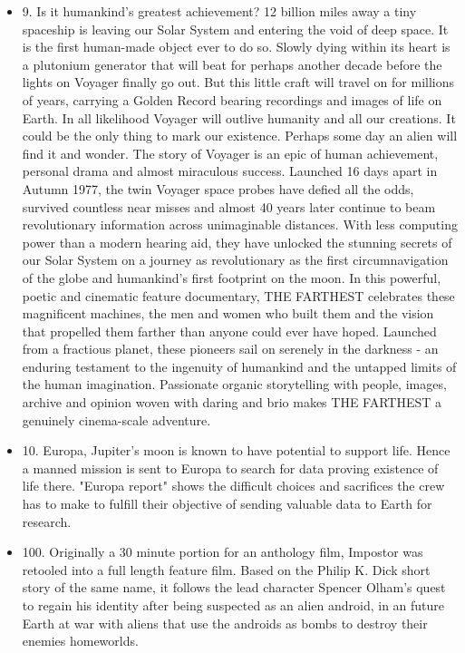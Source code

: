 \begin{itemize}
    \item 9. Is it humankind's greatest achievement? 12 billion miles away a tiny spaceship is leaving our Solar System and entering the void of deep space. It is the first human-made object ever to do so. Slowly dying within its heart is a plutonium generator that will beat for perhaps another decade before the lights on Voyager finally go out. But this little craft will travel on for millions of years, carrying a Golden Record bearing recordings and images of life on Earth. In all likelihood Voyager will outlive humanity and all our creations. It could be the only thing to mark our existence. Perhaps some day an alien will find it and wonder. The story of Voyager is an epic of human achievement, personal drama and almost miraculous success. Launched 16 days apart in Autumn 1977, the twin Voyager space probes have defied all the odds, survived countless near misses and almost 40 years later continue to beam revolutionary information across unimaginable distances. With less computing power than a modern hearing aid, they have unlocked the stunning secrets of our Solar System on a journey as revolutionary as the first circumnavigation of the globe and humankind's first footprint on the moon. In this powerful, poetic and cinematic feature documentary, THE FARTHEST celebrates these magnificent machines, the men and women who built them and the vision that propelled them farther than anyone could ever have hoped. Launched from a fractious planet, these pioneers sail on serenely in the darkness - an enduring testament to the ingenuity of humankind and the untapped limits of the human imagination. Passionate organic storytelling with people, images, archive and opinion woven with daring and brio makes THE FARTHEST a genuinely cinema-scale adventure.
    \item 10. Europa, Jupiter's moon is known to have potential to support life. Hence a manned mission is sent to Europa to search for data proving existence of life there. "Europa report" shows the difficult choices and sacrifices the crew has to make to fulfill their objective of sending valuable data to Earth for research.
    \item 100. Originally a 30 minute portion for an anthology film, Impostor was retooled into a full length feature film. Based on the Philip K. Dick short story of the same name, it follows the lead character Spencer Olham's quest to regain his identity after being suspected as an alien android, in an future Earth at war with aliens that use the androids as bombs to destroy their enemies homeworlds.
\end{itemize}